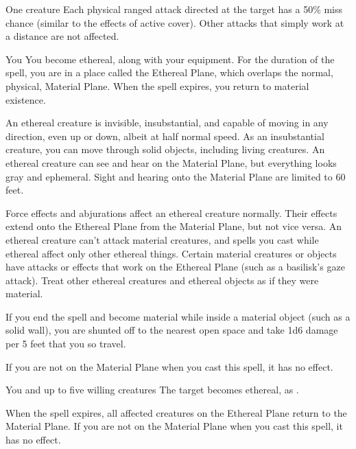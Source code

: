 \spelldur{\durshort \dismissable}
\begin{spelltarget}{One creature}
    \spelleffect Each physical ranged attack directed at the target has a 50\% miss chance (similar to the effects of active cover). Other attacks that simply work at a distance are not affected.
\end{spelltarget}

\spelldur{\durshort \dismissable}
\begin{spelltarget}{You}
    \spelleffect You become ethereal, along with your equipment. For the duration of the spell, you are in a place called the Ethereal Plane, which overlaps the normal, physical, Material Plane. When the spell expires, you return to material existence.
    \par An ethereal creature is invisible, insubstantial, and capable of moving in any direction, even up or down, albeit at half normal speed. As an insubstantial creature, you can move through solid objects, including living creatures. An ethereal creature can see and hear on the Material Plane, but everything looks gray and ephemeral. Sight and hearing onto the Material Plane are limited to 60 feet.
    \par Force effects and abjurations affect an ethereal creature normally. Their effects extend onto the Ethereal Plane from the Material Plane, but not vice versa. An ethereal creature can't attack material creatures, and spells you cast while ethereal affect only other ethereal things. Certain material creatures or objects have attacks or effects that work on the Ethereal Plane (such as a basilisk's gaze attack). Treat other ethereal creatures and ethereal objects as if they were material. 
    \par If you end the spell and become material while inside a material object (such as a solid wall), you are shunted off to the nearest open space and take 1d6 damage per 5 feet that you so travel.
\end{spelltarget}
\spellnotes If you are not on the Material Plane when you cast this spell, it has no effect.

\begin{spelltarget}{You and up to five willing creatures}
    \spelleffect The target becomes ethereal, as .
\end{spelltarget}
\spellnotes When the spell expires, all affected creatures on the Ethereal Plane return to the Material Plane. If you are not on the Material Plane when you cast this spell, it has no effect.

